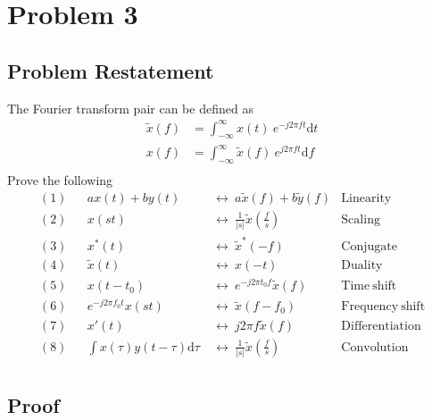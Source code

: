\documentclass{article}
\begin{document}
\section{Problem 3}

\subsection{Problem Restatement}

The Fourier transform pair can be defined as
\begin{align*}
    \widetilde{x}(f) &= \int_{- \infty}^{\infty} x(t) ~ e^{-j2\pi f t} \mathrm{d}t\\
    x(f) &= \int_{- \infty}^{\infty} \widetilde{x}(f) ~ e^{j2\pi f t} \mathrm{d}f\\
\end{align*}
Prove the following
\begin{align*}
    (1)&&  ax(t) + by(t)~ & \leftrightarrow ~a\widetilde{x}(f) + b\widetilde{y}(f) &\mathrm{Linearity}\\
    (2)&&  x(st)~& \leftrightarrow ~\frac{1}{|s|} \widetilde{x}(\frac{f}{s}) &\mathrm{Scaling}\\
    (3)&&  x^*(t)~& \leftrightarrow ~\widetilde{x}^*(-f) &\mathrm{Conjugate}\\
    (4)&&  \widetilde{x}(t)~ & \leftrightarrow ~x(-t) &\mathrm{Duality}\\
    (5)&&  x(t - t_0)~& \leftrightarrow  ~e^{-j2\pi t_0 f}\widetilde{x}(f) &\mathrm{Time~shift}\\
    (6)&&  e^{-j2\pi f_0 t}x(st)~& \leftrightarrow  ~\widetilde{x}(f - f_0) &\mathrm{Frequency~shift}\\
    (7)&&  x'(t)~& \leftrightarrow  ~j2\pi f\widetilde{x}(f) &\mathrm{Differentiation}\\
    (8)&&  \int x(\tau)y(t - \tau)\mathrm{d}\tau~ & \leftrightarrow ~\frac{1}{|s|}\widetilde{x}(\frac{f}{s})&\mathrm{Convolution}\\
\end{align*}

\subsection{Proof}
\end{document}
